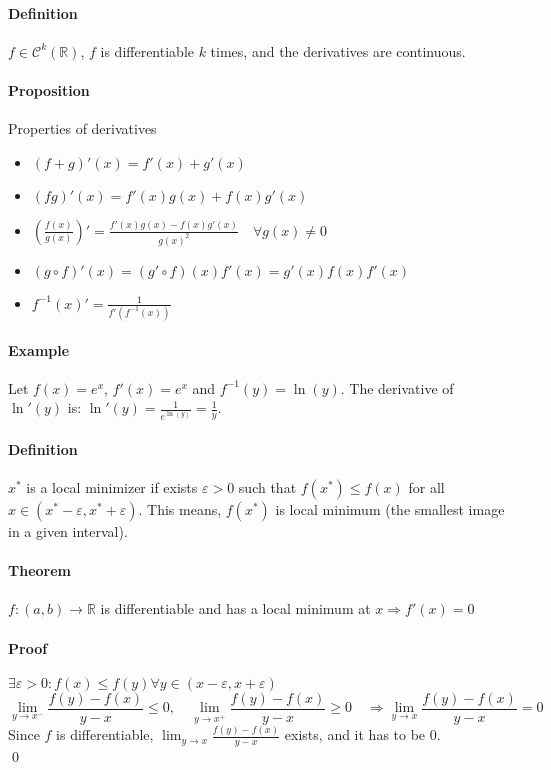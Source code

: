 \documentclass{article}
\newcommand{\DS}{\displaystyle}
\newcommand{\functoR}[2]{#1 : #2 \rightarrow \mathbb{R}}
\newcommand{\intoo}[1]{\left(#1\right)}
\newcommand{\R}{\mathbb{R}}
\newcommand{\Ep}{\varepsilon}
\newcommand{\Def}{\paragraph{Definition}}
\newcommand{\Proposition}{\paragraph{Proposition}}
\newcommand{\Theorem}{\paragraph{Theorem}}
\newcommand{\Proof}{\paragraph{Proof}}
\newcommand{\Example}{\paragraph{Example}}
\begin{document}
  \Def $f \in \mathcal{C}^k(\R)$, $f$ is differentiable $k$ times, and the
  derivatives are continuous.

  \Proposition Properties of derivatives
  \begin{itemize}
    \item $(f + g)'(x) = f'(x) + g'(x)$
    \item $(fg)'(x) = f'(x)g(x) + f(x)g'(x)$
    \item $(\frac{f(x)}{g(x)})' = \frac{f'(x)g(x)-f(x)g'(x)}{g(x)^2}
    \quad \forall g(x) \neq 0$
    \item $(g \circ f)'(x) = (g' \circ f)(x)f'(x) = g'(x)f(x)f'(x)$
    \item $f^{-1}(x)' = \frac{1}{f'(f^{-1}(x))}$
  \end{itemize}

  \Example Let $f(x) = e^x$, $f'(x) = e^x$ and $f^{-1}(y) = \ln(y)$. The
  derivative of $\ln'(y)$ is: $\ln'(y) = \frac{1}{e^{\ln(y)}} = \frac{1}{y}$.

  \Def $x^*$ is a local minimizer if exists $\Ep > 0$ such that $f(x^*) \leq
  f(x)$ for all $x \in \intoo{x^*-\Ep, x^*+\Ep}$. This means, $f(x^*)$ is local
  minimum (the smallest image in a given interval).

  \Theorem $\functoR{f}{\intoo{a,b}}$ is differentiable and has a local minimum
  at $x \Rightarrow f'(x) = 0$

  \Proof $\exists \Ep > 0 : f(x) \leq f(y) \forall y \in \intoo{x-\Ep,x+\Ep}$
  \begin{equation*}
    \lim_{y \to x^-} \frac{f(y)-f(x)}{y-x} \leq 0, \quad
    \lim_{y \to x^+} \frac{f(y)-f(x)}{y-x} \geq 0 \quad \Rightarrow
    \lim_{y \to x} \frac{f(y)-f(x)}{y-x} = 0
  \end{equation*}
  Since $f$ is differentiable, $\DS \lim_{y \to x}\frac{f(y)-f(x)}{y-x}$ exists,
  and it has to be 0.
\\\qed
\end{document}
